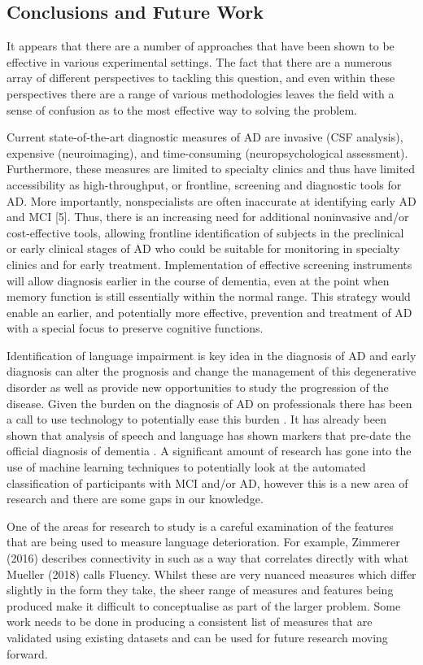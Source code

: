 \documentclass{article}
\begin{document}
\subsection{Conclusions and Future Work}
It appears that there are a number of approaches that have been shown to be effective in various experimental settings. The fact that there are a numerous array of different perspectives to tackling this question, and even within these perspectives there are a range of various methodologies leaves the field with a sense of confusion as to the most effective way to solving the problem.
\par
Current state-of-the-art diagnostic measures of AD are invasive (CSF analysis), expensive (neuroimaging), and time-consuming (neuropsychological assessment). Furthermore, these measures are limited to specialty clinics and thus have limited accessibility as high-throughput, or frontline, screening and diagnostic tools for AD. More importantly, nonspecialists are often inaccurate at identifying early AD and MCI [5]. Thus, there is an increasing need for additional noninvasive and/or cost-effective tools, allowing frontline identification of subjects in the preclinical or early clinical stages of AD who could be suitable for monitoring in specialty clinics and for early treatment. Implementation of effective screening instruments will allow diagnosis earlier in the course of dementia, even at the point when memory function is still essentially within the normal range. This strategy would enable an earlier, and potentially more effective, prevention and treatment of AD with a special focus to preserve cognitive functions.
\par
Identification of language impairment is key idea in the diagnosis of AD and early diagnosis can alter the prognosis and change the management of this degenerative disorder as well as provide new opportunities to study the progression of the disease. Given the burden on the diagnosis of AD on professionals there has been a call to use technology to potentially ease this burden \cite{Boschi2017}. It has already been shown that analysis of speech and language has shown markers that pre-date the official diagnosis of dementia \cite{Snowdon1996, Berisha2015}. A significant amount of research has gone into the use of machine learning techniques to potentially look at the automated classification of participants with MCI and/or AD, however this is a new area of research and there are some gaps in our knowledge.
\par
One of the areas for research to study is a careful examination of the features that are being used to measure language deterioration. For example, Zimmerer (2016) \cite{Zimmerer2016} describes connectivity in such as a way that correlates directly with what Mueller (2018) \cite{Mueller2018a} calls Fluency. Whilst these are very nuanced measures which differ slightly in the form they take, the sheer range of measures and features being produced make it difficult to conceptualise as part of the larger problem. Some work needs to be done in producing a consistent list of measures that are validated using existing datasets and can be used for future research moving forward. \newline
\par
\end{document}

